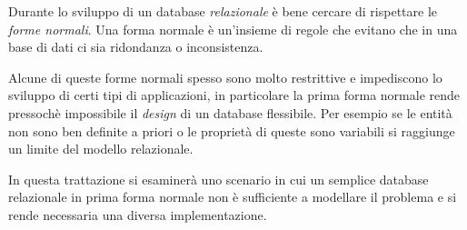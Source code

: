 Durante lo sviluppo di un database \emph{relazionale} è bene cercare di rispettare le \emph{forme normali}. Una forma normale è un'insieme di regole che evitano che in una base di dati ci sia  ridondanza o inconsistenza.

Alcune di queste forme normali spesso sono molto restrittive e impediscono lo sviluppo di certi tipi di applicazioni, in particolare la prima forma normale rende pressochè impossibile il \emph{design} di un database flessibile. Per esempio se le entità non sono ben definite a priori o le proprietà di queste sono variabili si raggiunge un limite del modello relazionale.

In questa trattazione si esaminerà uno scenario in cui un semplice database relazionale in prima forma normale non è sufficiente a modellare il problema e si rende necessaria una diversa implementazione.